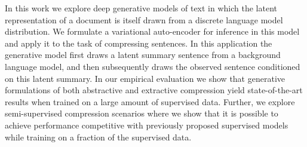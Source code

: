 In this work we explore deep generative models of text in which the latent representation of a document is itself drawn from a discrete language model distribution. We formulate a variational auto-encoder for inference in this model and apply it to the task of compressing sentences. In this application the generative model first draws a latent summary sentence from a background language model, and then subsequently draws the observed sentence conditioned on this latent summary. In our empirical evaluation we show that generative formulations of both abstractive and extractive compression yield state-of-the-art results when trained on a large amount of supervised data. Further, we explore semi-supervised compression scenarios where we show that it is possible to achieve performance competitive with previously proposed supervised models while training on a fraction of the supervised data.

